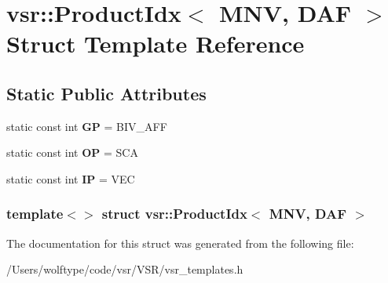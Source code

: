 \hypertarget{structvsr_1_1_product_idx_3_01_m_n_v_00_01_d_a_f_01_4}{\section{vsr\-:\-:Product\-Idx$<$ M\-N\-V, D\-A\-F $>$ Struct Template Reference}
\label{structvsr_1_1_product_idx_3_01_m_n_v_00_01_d_a_f_01_4}
}
\subsection*{Static Public Attributes}
\begin{DoxyCompactItemize}
\item 
\hypertarget{structvsr_1_1_product_idx_3_01_m_n_v_00_01_d_a_f_01_4_a4a13ad60a033729e2767ba6a5719fee3}{static const int {\bfseries G\-P} = B\-I\-V\-\_\-\-A\-F\-F}\label{structvsr_1_1_product_idx_3_01_m_n_v_00_01_d_a_f_01_4_a4a13ad60a033729e2767ba6a5719fee3}

\item 
\hypertarget{structvsr_1_1_product_idx_3_01_m_n_v_00_01_d_a_f_01_4_a9cdaf3be38c17b490d363955acc93e6c}{static const int {\bfseries O\-P} = S\-C\-A}\label{structvsr_1_1_product_idx_3_01_m_n_v_00_01_d_a_f_01_4_a9cdaf3be38c17b490d363955acc93e6c}

\item 
\hypertarget{structvsr_1_1_product_idx_3_01_m_n_v_00_01_d_a_f_01_4_ab043ae771df39a620a86a50e08913b53}{static const int {\bfseries I\-P} = V\-E\-C}\label{structvsr_1_1_product_idx_3_01_m_n_v_00_01_d_a_f_01_4_ab043ae771df39a620a86a50e08913b53}

\end{DoxyCompactItemize}
\subsubsection*{template$<$$>$ struct vsr\-::\-Product\-Idx$<$ M\-N\-V, D\-A\-F $>$}



The documentation for this struct was generated from the following file\-:\begin{DoxyCompactItemize}
\item 
/\-Users/wolftype/code/vsr/\-V\-S\-R/vsr\-\_\-templates.\-h\end{DoxyCompactItemize}
